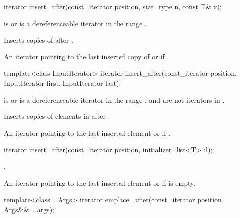 %
\begin{itemdecl}
iterator insert_after(const_iterator position, size_type n, const T& x);
\end{itemdecl}

\begin{itemdescr}
\pnum
\requires {} is  or is a dereferenceable
iterator in the range .

\pnum
\effects Inserts  copies of  after .

\pnum
\returns
An iterator pointing to the last inserted copy of  or  if .
\end{itemdescr}

%
\begin{itemdecl}
template<class InputIterator>
  iterator insert_after(const_iterator position, InputIterator first, InputIterator last);
\end{itemdecl}

\begin{itemdescr}
\pnum
\requires {} is  or is a dereferenceable
iterator in the range .
 and  are not iterators in .

\pnum
\effects Inserts copies of elements in  after .

\pnum
\returns
An iterator pointing to the last inserted element or  if .
\end{itemdescr}

%
\begin{itemdecl}
iterator insert_after(const_iterator position, initializer_list<T> il);
\end{itemdecl}

\begin{itemdescr}
\pnum
\effects {}.

\pnum
\returns
An iterator pointing to the last inserted element or  if  is empty.
\end{itemdescr}


%
\begin{itemdecl}
template<class... Args>
  iterator emplace_after(const_iterator position, Args&&... args);
\end{itemdecl}


